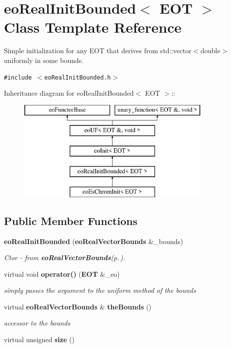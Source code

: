 \section{eo\-Real\-Init\-Bounded$<$ EOT $>$ Class Template Reference}
\label{classeo_real_init_bounded}
Simple initialization for any EOT that derives from std::vector$<$double$>$ uniformly in some bounds.  


{\tt \#include $<$eo\-Real\-Init\-Bounded.h$>$}

Inheritance diagram for eo\-Real\-Init\-Bounded$<$ EOT $>$::\begin{figure}[H]
\begin{center}
\leavevmode
\includegraphics[height=5cm]{classeo_real_init_bounded}
\end{center}
\end{figure}
\subsection*{Public Member Functions}
\begin{CompactItemize}
\item 
{\bf eo\-Real\-Init\-Bounded} ({\bf eo\-Real\-Vector\-Bounds} \&\_\-bounds)\label{classeo_real_init_bounded_a0}

\begin{CompactList}\small\item\em Ctor - from {\bf eo\-Real\-Vector\-Bounds}{\rm (p.\,\pageref{classeo_real_vector_bounds})}. \item\end{CompactList}\item 
virtual void {\bf operator()} ({\bf EOT} \&\_\-eo)\label{classeo_real_init_bounded_a1}

\begin{CompactList}\small\item\em simply passes the argument to the uniform method of the bounds \item\end{CompactList}\item 
virtual {\bf eo\-Real\-Vector\-Bounds} \& {\bf the\-Bounds} ()\label{classeo_real_init_bounded_a2}

\begin{CompactList}\small\item\em accessor to the bounds \item\end{CompactList}\item 
virtual unsigned {\bf size} ()\label{classeo_real_init_bounded_a3}

\end{CompactItemize}
